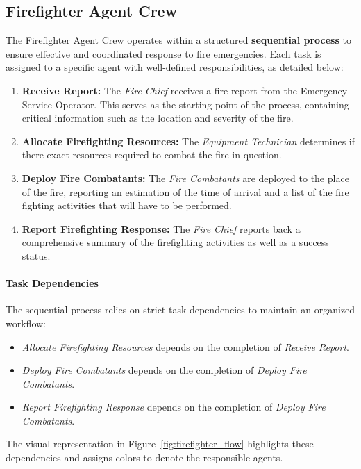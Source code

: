 \subsection{Firefighter Agent Crew}

The Firefighter Agent Crew operates within a structured \textbf{sequential process} to ensure effective and coordinated response to fire emergencies. Each task is assigned to a specific agent with well-defined responsibilities, as detailed below:

\begin{enumerate}
    \item \textbf{Receive Report:} The \textit{Fire Chief} receives a fire report from the Emergency Service Operator. This serves as the starting point of the process, containing critical information such as the location and severity of the fire.
    \item \textbf{Allocate Firefighting Resources:} The \textit{Equipment Technician} determines if there exact resources required to combat the fire in question.
	\item \textbf{Deploy Fire Combatants:} The \textit{Fire Combatants} are deployed to the place of the fire, reporting an estimation of the time of arrival and a list of the fire fighting activities that will have to be performed.
	\item \textbf{Report Firefighting Response:} The \textit{Fire Chief} reports back a comprehensive summary of the firefighting activities as well as a success status.
\end{enumerate}

\paragraph{Task Dependencies}
The sequential process relies on strict task dependencies to maintain an organized workflow:
\begin{itemize}
    \item \textit{Allocate Firefighting Resources} depends on the completion of \textit{Receive Report}.
    \item \textit{Deploy Fire Combatants} depends on the completion of \textit{Deploy Fire Combatants}.
    \item \textit{Report Firefighting Response} depends on the completion of \textit{Deploy Fire Combatants}.
\end{itemize}

The visual representation in Figure~\ref{fig:firefighter_flow} highlights these dependencies and assigns colors to denote the responsible agents.

